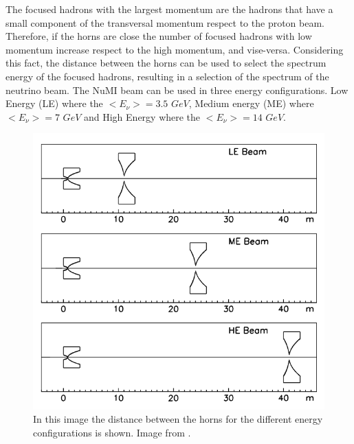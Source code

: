 The focused hadrons with the largest momentum are the hadrons that have a small component of the transversal momentum respect to the proton beam. Therefore, if the horns are close the number of focused hadrons with low momentum increase respect to the high momentum, and vise-versa. Considering this fact, the distance between the horns can be used to select the spectrum energy of the focused hadrons, resulting in a selection of the spectrum of the neutrino beam. The NuMI beam can be used in three energy configurations. Low Energy (LE) where the $<E_\nu>=3.5$ $GeV$, Medium energy (ME) where $<E_\nu>=7$ $GeV$ and High Energy where the $<E_\nu> = 14$ $GeV$\cite{BeamOptics}. 

\begin{figure}[!htb]
\centering
\includegraphics[scale=0.4]{Figures/Chapter2/HornsDistance.png}
        \caption{In this image the distance between the horns for the different energy configurations is shown. Image from \cite{BeamOptics}.} 
\label{fig:MnvExp:NuMI:NuMIFocusingComponents}
\end{figure}

